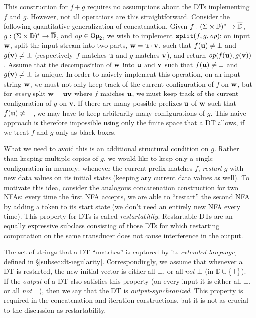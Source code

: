This construction for $f+g$ requires no assumptions about the DTs implementing $f$ and $g$.
However, not all operations are this straightforward.
Consider the following quantitative generalization of concatenation. Given $f: (\Sigma \times \mathbb{D})^{*} \to \overline{\mathbb{D}{}}$, $g: (\Sigma \times \mathbb{D})^{*} \to \overline{\mathbb{D}{}}$, and $\mathit{op} \in \textsf{Op}_2$, we wish to implement $\texttt{split}(f,g,\mathit{op})$:
on input $\textbf{w}$, split the input stream into two parts, $\textbf{w} = \textbf{u} \cdot \textbf{v}$, such that $f(\textbf{u}) \ne \bot$ and $g(\textbf{v}) \ne \bot$ (respectively, $f$ matches $\textbf{u}$ and $g$ matches $\textbf{v}$), and return $\mathit{op}(f(\textbf{u}),g(\textbf{v}))$. Assume that the decomposition of $\textbf{w}$ into $\textbf{u}$ and $\textbf{v}$ such that $f(\textbf{u}) \ne \bot$ and $g(\textbf{v}) \ne \bot$ is unique.
In order to naively implement this operation, on an input string $\textbf{w}$, we must not only keep track of the current
configuration of $f$ on $\textbf{w}$,
but for \emph{every} split $\textbf{w} = \textbf{u} \textbf{v}$ where $f$ matches $\textbf{u}$,
we must keep track of the current configuration of $g$ on $\textbf{v}$.
If there are many possible prefixes $\textbf{u}$ of $\textbf{w}$ such that $f(\textbf{u}) \ne \bot$, we may have to keep arbitrarily many configurations of $g$. This naive approach is therefore impossible using only the finite space that a DT allows, if we treat $f$ and $g$ only as black boxes.

What we need to avoid this is an additional structural condition on $g$. Rather than keeping multiple copies of $g$, we would like to keep only a single configuration in memory: whenever the current prefix matches $f$, \emph{restart} $g$ with new data values on its initial states (keeping any current data values as well).
To motivate this idea, consider the analogous concatenation construction for two NFAs: every time the first NFA accepts, we are able to ``restart'' the second NFA by adding a token to its start state (we don't need an entirely new NFA every time).
This property for DTs is called \emph{restartability}.
Restartable DTs are an equally expressive subclass
consisting of those DTs for which restarting computation on the same transducer does not cause interference in the output.

The set of strings that a DT ``matches'' is captured by its \emph{extended language}, defined in \S\ref{subsec:dt-regularity}. Correspondingly, we assume that whenever a DT is restarted, the new initial vector is either all $\bot$, or all \emph{not} $\bot$ (in $\mathbb{D} \cup \{\top\}$). If the \emph{output} of a DT also satisfies this property (on every input it is either all $\bot$, or all \emph{not} $\bot$), then we say that the DT is \emph{output-synchronized}. This property is required in the concatenation and iteration constructions, but it is not as crucial to the discussion as restartability.

